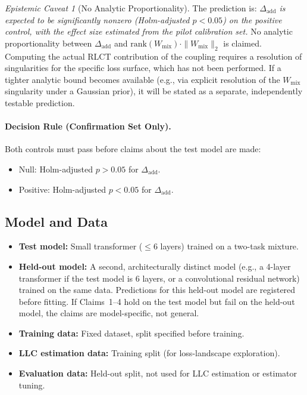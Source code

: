 \documentclass[11pt,a4paper]{article}
\theoremstyle{definition}
\theoremstyle{remark}
\newtheorem{caveat}[theorem]{Epistemic Caveat}
\newcommand{\Dadd}{\Delta_{\mathrm{add}}}
\begin{document}
\begin{caveat}[No Analytic Proportionality]\label{cav:no-prop}
  The prediction is: \emph{$\Dadd$ is expected to be significantly nonzero
  (Holm-adjusted $p < 0.05$) on the positive control, with the effect size
  estimated from the pilot calibration set.}  No analytic proportionality
  between $\Dadd$ and
  $\mathrm{rank}(W_{\mathrm{mix}}) \cdot \|W_{\mathrm{mix}}\|_2$
  is claimed.  Computing the actual RLCT contribution
  of the coupling requires a resolution of singularities for the specific loss
  surface, which has not been performed.  If a tighter analytic bound becomes
  available (e.g., via explicit resolution of the $W_{\mathrm{mix}}$ singularity
  under a Gaussian prior), it will be stated as a separate, independently
  testable prediction.
\end{caveat}

\paragraph{Decision Rule (Confirmation Set Only).}
Both controls must pass before claims about the test model are made:
\begin{itemize}
  \item Null: Holm-adjusted $p > 0.05$ for $\Dadd$.
  \item Positive: Holm-adjusted $p < 0.05$ for $\Dadd$.
\end{itemize}

\subsection{Model and Data}\label{subsec:model}

\begin{itemize}
  \item \textbf{Test model:} Small transformer ($\leq 6$ layers) trained on a
    two-task mixture.
  \item \textbf{Held-out model:} A second, architecturally distinct model
    (e.g., a 4-layer transformer if the test model is 6 layers, or a
    convolutional residual network) trained on the same data.  Predictions for
    this held-out model are registered before fitting.  If Claims~1--4 hold on
    the test model but fail on the held-out model, the claims are
    model-specific, not general.
  \item \textbf{Training data:} Fixed dataset, split specified before training.
  \item \textbf{LLC estimation data:} Training split (for loss-landscape
    exploration).
  \item \textbf{Evaluation data:} Held-out split, not used for LLC estimation
    or estimator tuning.
\end{itemize}
\end{document}
